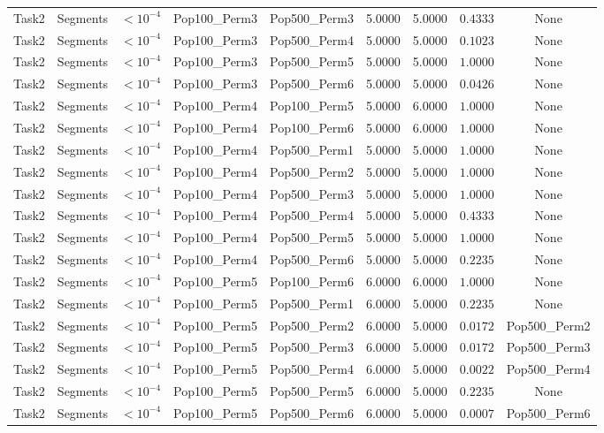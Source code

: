 \documentclass[8pt]{article}
\begin{document}
\begin{longtable}{llccccccc}
Task2 & Segments & $< 10^{-4}$ & Pop100\_Perm3 & Pop500\_Perm3 & 5.0000 & 5.0000 & $0.4333$ & None \\
Task2 & Segments & $< 10^{-4}$ & Pop100\_Perm3 & Pop500\_Perm4 & 5.0000 & 5.0000 & $0.1023$ & None \\
Task2 & Segments & $< 10^{-4}$ & Pop100\_Perm3 & Pop500\_Perm5 & 5.0000 & 5.0000 & $1.0000$ & None \\
Task2 & Segments & $< 10^{-4}$ & Pop100\_Perm3 & Pop500\_Perm6 & 5.0000 & 5.0000 & $0.0426$ & None \\
Task2 & Segments & $< 10^{-4}$ & Pop100\_Perm4 & Pop100\_Perm5 & 5.0000 & 6.0000 & $1.0000$ & None \\
Task2 & Segments & $< 10^{-4}$ & Pop100\_Perm4 & Pop100\_Perm6 & 5.0000 & 6.0000 & $1.0000$ & None \\
Task2 & Segments & $< 10^{-4}$ & Pop100\_Perm4 & Pop500\_Perm1 & 5.0000 & 5.0000 & $1.0000$ & None \\
Task2 & Segments & $< 10^{-4}$ & Pop100\_Perm4 & Pop500\_Perm2 & 5.0000 & 5.0000 & $1.0000$ & None \\
Task2 & Segments & $< 10^{-4}$ & Pop100\_Perm4 & Pop500\_Perm3 & 5.0000 & 5.0000 & $1.0000$ & None \\
Task2 & Segments & $< 10^{-4}$ & Pop100\_Perm4 & Pop500\_Perm4 & 5.0000 & 5.0000 & $0.4333$ & None \\
Task2 & Segments & $< 10^{-4}$ & Pop100\_Perm4 & Pop500\_Perm5 & 5.0000 & 5.0000 & $1.0000$ & None \\
Task2 & Segments & $< 10^{-4}$ & Pop100\_Perm4 & Pop500\_Perm6 & 5.0000 & 5.0000 & $0.2235$ & None \\
Task2 & Segments & $< 10^{-4}$ & Pop100\_Perm5 & Pop100\_Perm6 & 6.0000 & 6.0000 & $1.0000$ & None \\
Task2 & Segments & $< 10^{-4}$ & Pop100\_Perm5 & Pop500\_Perm1 & 6.0000 & 5.0000 & $0.2235$ & None \\
Task2 & Segments & $< 10^{-4}$ & Pop100\_Perm5 & Pop500\_Perm2 & 6.0000 & 5.0000 & $0.0172$ & Pop500\_Perm2 \\
Task2 & Segments & $< 10^{-4}$ & Pop100\_Perm5 & Pop500\_Perm3 & 6.0000 & 5.0000 & $0.0172$ & Pop500\_Perm3 \\
Task2 & Segments & $< 10^{-4}$ & Pop100\_Perm5 & Pop500\_Perm4 & 6.0000 & 5.0000 & $0.0022$ & Pop500\_Perm4 \\
Task2 & Segments & $< 10^{-4}$ & Pop100\_Perm5 & Pop500\_Perm5 & 6.0000 & 5.0000 & $0.2235$ & None \\
Task2 & Segments & $< 10^{-4}$ & Pop100\_Perm5 & Pop500\_Perm6 & 6.0000 & 5.0000 & $0.0007$ & Pop500\_Perm6 \\

\end{longtable}
\end{document}
